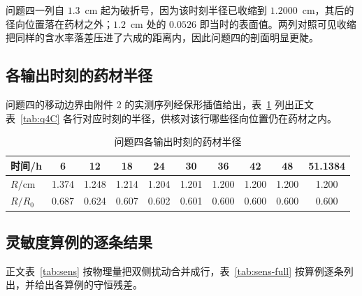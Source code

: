 问题四一列自 $1.3$~cm 起为破折号，因为该时刻半径已收缩到 $1.2000$~cm，其后的径向位置落在药材之外；$1.2$~cm 处的 $0.0526$ 即当时的表面值。两列对照可见收缩把同样的含水率落差压进了六成的距离内，因此问题四的剖面明显更陡。

\subsection{各输出时刻的药材半径}

问题四的移动边界由附件 2 的实测序列经保形插值给出，表~\ref{tab:radius} 列出正文表~\ref{tab:q4C} 各行对应时刻的半径，供核对该行哪些径向位置仍在药材之内。

\begin{table}[H]
\centering
\caption{问题四各输出时刻的药材半径}\label{tab:radius}
\begin{tabular}{lccccccccc}
\toprule
时间/h & 6 & 12 & 18 & 24 & 30 & 36 & 42 & 48 & 51.1384 \\
\midrule
$R$/cm & 1.374 & 1.248 & 1.214 & 1.204 & 1.201 & 1.200 & 1.200 & 1.200 & 1.200 \\
$R/R_0$ & 0.687 & 0.624 & 0.607 & 0.602 & 0.601 & 0.600 & 0.600 & 0.600 & 0.600 \\
\bottomrule
\end{tabular}
\end{table}

\subsection{灵敏度算例的逐条结果}

正文表~\ref{tab:sens} 按物理量把双侧扰动合并成行，表~\ref{tab:sens-full} 按算例逐条列出，并给出各算例的守恒残差。

